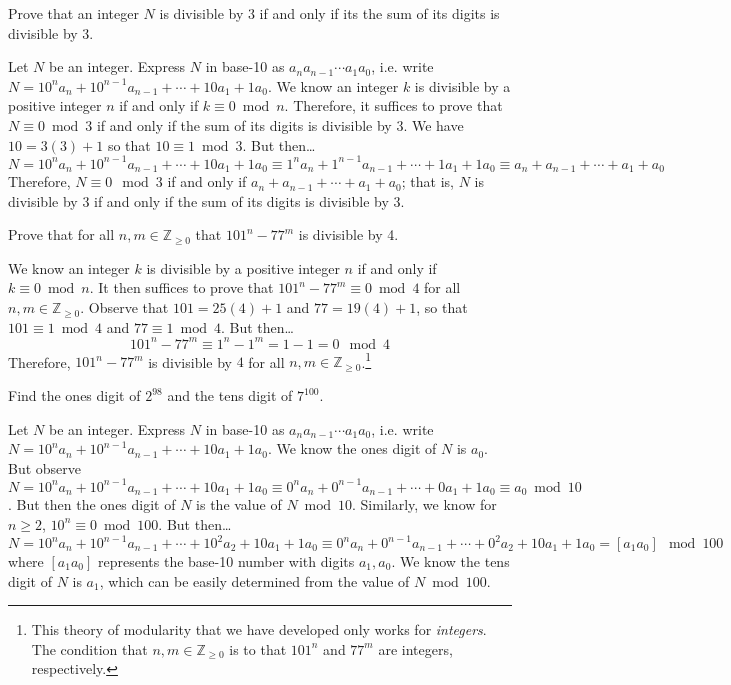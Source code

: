 \documentclass[11pt,letterpaper]{article}
\begin{document}
\newpage



 Prove that an integer $N$ is divisible by 3 if and only if its the sum of its digits is divisible by 3. \pspace 

\sol Let $N$ be an integer. Express $N$ in base-10 as $a_na_{n-1}\cdots a_1a_0$, i.e. write $N= 10^n a_n + 10^{n-1} a_{n-1} + \cdots + 10a_1 + 1a_0$. We know an integer $k$ is divisible by a positive integer $n$ if and only if $k \equiv 0 \bmod n$. Therefore, it suffices to prove that $N \equiv 0 \bmod 3$ if and only if the sum of its digits is divisible by 3. We have $10= 3(3) + 1$ so that $10 \equiv 1 \bmod 3$. But then\dots
	\[
	N= 10^n a_n + 10^{n-1} a_{n-1} + \cdots + 10a_1 + 1a_0 \equiv 1^n a_n + 1^{n-1} a_{n-1} + \cdots + 1a_1 + 1a_0 \equiv a_n + a_{n-1} + \cdots + a_1 + a_0
	\]
Therefore, $N \equiv 0 \mod 3$ if and only if $a_n + a_{n-1} + \cdots + a_1 + a_0$; that is, $N$ is divisible by $3$ if and only if the sum of its digits is divisible by $3$. 



\newpage



 Prove that for all $n, m \in \mathbb{Z}_{\geq 0}$ that $101^n - 77^m$ is divisible by 4. \pspace

\sol We know an integer $k$ is divisible by a positive integer $n$ if and only if $k \equiv 0 \bmod n$. It then suffices to prove that $101^n - 77^m \equiv 0 \bmod 4$ for all $n, m \in \mathbb{Z}_{\geq 0}$. Observe that $101= 25(4) + 1$ and $77= 19(4) + 1$, so that $101 \equiv 1 \bmod 4$ and $77 \equiv 1 \bmod 4$. But then\dots
	\[
	101^n - 77^m \equiv 1^n - 1^m = 1 - 1= 0 \mod 4
	\]
Therefore, $101^n - 77^m$ is divisible by $4$ for all $n, m \in \mathbb{Z}_{\geq 0}$.\footnote{This theory of modularity that we have developed only works for \textit{integers}. The condition that $n, m \in \mathbb{Z}_{\geq 0}$ is to that $101^n$ and $77^m$ are integers, respectively.} \pspace



\newpage



 Find the ones digit of $2^{98}$ and the tens digit of $7^{100}$. \pspace

\sol Let $N$ be an integer. Express $N$ in base-10 as $a_na_{n-1}\cdots a_1a_0$, i.e. write $N= 10^n a_n + 10^{n-1} a_{n-1} + \cdots + 10a_1 + 1a_0$. We know the ones digit of $N$ is $a_0$. But observe $N= 10^n a_n + 10^{n-1} a_{n-1} + \cdots + 10a_1 + 1a_0 \equiv 0^n a_n + 0^{n-1} a_{n-1} + \cdots + 0a_1 + 1a_0 \equiv a_0 \bmod 10$. But then the ones digit of $N$ is the value of $N \bmod 10$. Similarly, we know for $n \geq 2$, $10^n \equiv 0 \bmod 100$. But then\dots
	\[
	N= 10^n a_n + 10^{n-1} a_{n-1} + \cdots + 10^2a_2 + 10a_1 + 1a_0 \equiv 0^n a_n + 0^{n-1} a_{n-1} + \cdots + 0^2a_2 + 10a_1 + 1a_0= [a_1a_0] \mod 100
	\]
where $[a_1a_0]$ represents the base-10 number with digits $a_1, a_0$. We know the tens digit of $N$ is $a_1$, which can be easily determined from the value of $N \bmod 100$. \pspace
\end{document}
